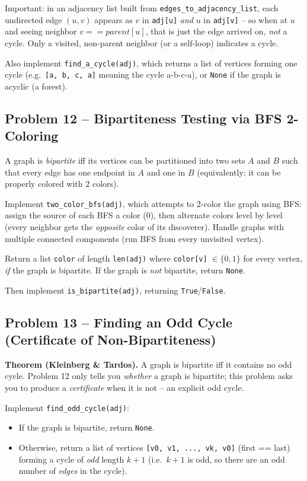 \documentclass[11pt]{article}
\begin{document}
Important: in an adjacency list built from \texttt{edges\_to\_adjacency\_list}, each
undirected edge $(u,v)$ appears as $v$ in \texttt{adj[u]} \emph{and} $u$ in
\texttt{adj[v]} -- so when at $u$ and seeing neighbor $v == parent[u]$, that is just the
edge arrived on, \emph{not} a cycle. Only a visited, non-parent neighbor (or a self-loop)
indicates a cycle.

Also implement \texttt{find\_a\_cycle(adj)}, which returns a list of vertices forming one
cycle (e.g.\ \texttt{[a, b, c, a]} meaning the cycle a-b-c-a), or \texttt{None} if the
graph is acyclic (a forest).

\subsection*{Problem 12 -- Bipartiteness Testing via BFS 2-Coloring}

A graph is \emph{bipartite} iff its vertices can be partitioned into two sets $A$ and $B$
such that every edge has one endpoint in $A$ and one in $B$ (equivalently: it can be
properly colored with 2 colors).

Implement \texttt{two\_color\_bfs(adj)}, which attempts to 2-color the graph using BFS:
assign the source of each BFS a color (0), then alternate colors level by level (every
neighbor gets the \emph{opposite} color of its discoverer). Handle graphs with multiple
connected components (run BFS from every unvisited vertex).

Return a list \texttt{color} of length \texttt{len(adj)} where \texttt{color[v]} $\in
\{0,1\}$ for every vertex, \emph{if} the graph is bipartite. If the graph is \emph{not}
bipartite, return \texttt{None}.

Then implement \texttt{is\_bipartite(adj)}, returning \texttt{True}/\texttt{False}.

\subsection*{Problem 13 -- Finding an Odd Cycle (Certificate of Non-Bipartiteness)}

\textbf{Theorem (Kleinberg \& Tardos).} A graph is bipartite iff it contains no odd
cycle. Problem 12 only tells you \emph{whether} a graph is bipartite; this problem asks
you to produce a \emph{certificate} when it is not -- an explicit odd cycle.

Implement \texttt{find\_odd\_cycle(adj)}:
\begin{itemize}
    \item If the graph is bipartite, return \texttt{None}.
    \item Otherwise, return a list of vertices \texttt{[v0, v1, ..., vk, v0]} (first ==
    last) forming a cycle of \emph{odd} length $k+1$ (i.e.\ $k+1$ is odd, so there are an
    odd number of \emph{edges} in the cycle).
\end{itemize}
\end{document}
